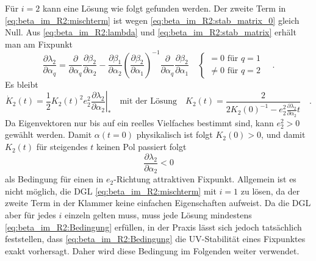     Für $i=2$ kann eine Lösung wie folgt gefunden werden. Der zweite Term in 
    \eqref{eq:beta_im_R2:mischterm} ist wegen 
    \eqref{eq:beta_im_R2:stab_matrix_0} gleich Null.
    Aus \eqref{eq:beta_im_R2:lambda} und \eqref{eq:beta_im_R2:stab_matrix} 
    erhält man am Fixpunkt
    \begin{equation}
     \frac{\partial \lambda_2}{\partial \alpha_q} = 
     \frac{\partial}{\partial \alpha_q} 
     \frac{\partial \beta_2}{\partial \alpha_2} -
     \frac{\partial \beta_1}{\partial \alpha_2} 
     \left(\frac{\partial \beta_2}{\partial \alpha_1} \right)^{-1}
     \frac{\partial}{\partial \alpha_q} 
     \frac{\partial \beta_2}{\partial \alpha_1} \quad 
         \begin{cases}
     =0 \text{ für }q=1\\
     \neq 0 \text{ für }q=2 
   \end{cases}
   \quad .
    \end{equation}
    Es bleibt 
    \begin{equation}
     \dot{K}_2(t) =\frac12 K_2(t)^2  e_2^2 
     \left. \frac{\partial \lambda_2}{\partial \alpha_2} \right|_* \quad 
   \text{mit der Lösung} \quad 
     K_2(t) = \frac{2}{2 K_2(0)^{-1} - 
     e_2^2 \frac{\partial \lambda_2}{\partial \alpha_2}t } \quad .
    \end{equation}
    Da Eigenvektoren nur bis auf ein reelles Vielfaches bestimmt sind, kann 
    $e_2^2>0$ gewählt werden. Damit $\alpha(t=0)$ physikalisch ist folgt 
    $K_2(0)>0$, und damit $K_2(t)$ für steigendes $t$ keinen Pol passiert folgt 
    \begin{equation}
     \frac{\partial \lambda_2}{\partial \alpha_2} < 0
     \label{eq:beta_im_R2:Bedingung}
    \end{equation}
    als Bedingung für einen in $e_2$-Richtung attraktiven Fixpunkt.
    Allgemein ist es nicht möglich, die DGL \eqref{eq:beta_im_R2:mischterm} 
    mit $i=1$ zu lösen, da der zweite Term in der Klammer keine einfachen Eigenschaften 
    aufweist. Da die DGL aber für jedes $i$ einzeln gelten muss, muss jede 
    Lösung mindestens \eqref{eq:beta_im_R2:Bedingung} erfüllen, in der Praxis 
    lässt sich jedoch tatsächlich feststellen, dass 
    \eqref{eq:beta_im_R2:Bedingung} die UV-Stabilität eines Fixpunktes exakt 
    vorhersagt. Daher wird diese Bedingung im Folgenden weiter verwendet.

 